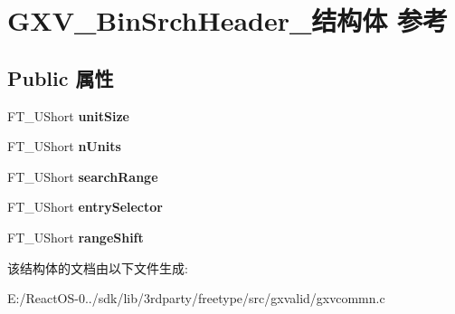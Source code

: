 \hypertarget{struct_g_x_v___bin_srch_header__}{}\section{G\+X\+V\+\_\+\+Bin\+Srch\+Header\+\_\+结构体 参考}
\label{struct_g_x_v___bin_srch_header__}
\subsection*{Public 属性}
\begin{DoxyCompactItemize}
\item 
\mbox{\label{struct_g_x_v___bin_srch_header___a84118c1112046d94ea426c3ecead8e00}} 
F\+T\+\_\+\+U\+Short {\bfseries unit\+Size}
\item 
\mbox{\label{struct_g_x_v___bin_srch_header___a6500cf229fd94fb87dac82ba35417738}} 
F\+T\+\_\+\+U\+Short {\bfseries n\+Units}
\item 
\mbox{\label{struct_g_x_v___bin_srch_header___a1c217b001da6ab39895e80ed7c73ebbc}} 
F\+T\+\_\+\+U\+Short {\bfseries search\+Range}
\item 
\mbox{\label{struct_g_x_v___bin_srch_header___aeeba5e1e9264696a085da636600bfff8}} 
F\+T\+\_\+\+U\+Short {\bfseries entry\+Selector}
\item 
\mbox{\label{struct_g_x_v___bin_srch_header___a357ee597ad5ba94d1cd0d6eefc963ea9}} 
F\+T\+\_\+\+U\+Short {\bfseries range\+Shift}
\end{DoxyCompactItemize}


该结构体的文档由以下文件生成\+:\begin{DoxyCompactItemize}
\item 
E\+:/\+React\+O\+S-\/0../sdk/lib/3rdparty/freetype/src/gxvalid/gxvcommn.\+c\end{DoxyCompactItemize}
